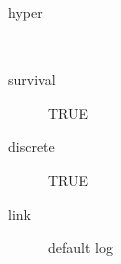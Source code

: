 \begin{description}
	\item[hyper]\ 
	 \item[ survival ] TRUE 
	 \item[ discrete ] TRUE 
	 \item[ link ] default log 
\end{description}
